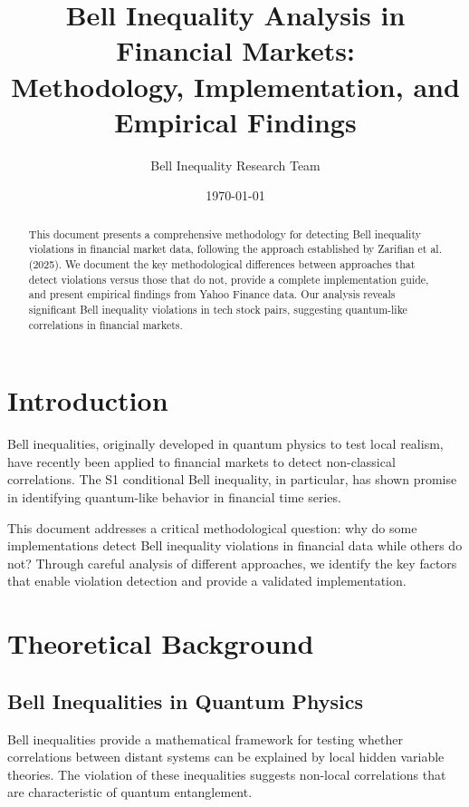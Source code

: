 \documentclass[11pt,a4paper]{article}
\title{Bell Inequality Analysis in Financial Markets:\\
Methodology, Implementation, and Empirical Findings}
\author{Bell Inequality Research Team}
\date{\today}
\begin{document}
\maketitle

\begin{abstract}
This document presents a comprehensive methodology for detecting Bell inequality violations in financial market data, following the approach established by Zarifian et al. (2025). We document the key methodological differences between approaches that detect violations versus those that do not, provide a complete implementation guide, and present empirical findings from Yahoo Finance data. Our analysis reveals significant Bell inequality violations in tech stock pairs, suggesting quantum-like correlations in financial markets.
\end{abstract}

\section{Introduction}

Bell inequalities, originally developed in quantum physics to test local realism, have recently been applied to financial markets to detect non-classical correlations. The S1 conditional Bell inequality, in particular, has shown promise in identifying quantum-like behavior in financial time series.

This document addresses a critical methodological question: why do some implementations detect Bell inequality violations in financial data while others do not? Through careful analysis of different approaches, we identify the key factors that enable violation detection and provide a validated implementation.

\section{Theoretical Background}

\subsection{Bell Inequalities in Quantum Physics}

Bell inequalities provide a mathematical framework for testing whether correlations between distant systems can be explained by local hidden variable theories. The violation of these inequalities suggests non-local correlations that are characteristic of quantum entanglement.
\end{document}
